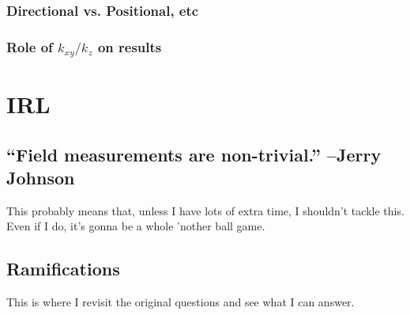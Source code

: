 \documentclass[10pt, letterpaper]{article}
\begin{document}
        \subsubsection{Directional vs. Positional, etc}
        \subsubsection{Role of \(k_{xy}/k_z\) on results}
    \section{IRL}
      \subsection{``Field measurements are non-trivial.'' --Jerry Johnson}
        This probably means that, unless I have lots of extra time, I shouldn't tackle this. Even if I do, it's gonna be a whole 'nother ball game.
      \subsection{Ramifications}
        This is where I revisit the original questions and see what I can answer.
\end{document}
